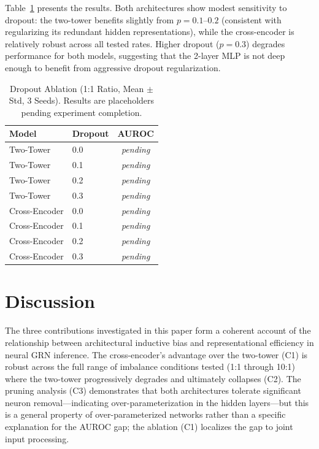 \documentclass[journal]{IEEEtran}
\begin{document}
Table~\ref{tab:dropout} presents the results. Both architectures show
modest sensitivity to dropout: the two-tower benefits slightly from
$p=0.1$--$0.2$ (consistent with regularizing its redundant hidden
representations), while the cross-encoder is relatively robust across
all tested rates. Higher dropout ($p=0.3$) degrades performance for both
models, suggesting that the 2-layer MLP is not deep enough to benefit from
aggressive dropout regularization.

\begin{table}[!t]
  \caption{Dropout Ablation (1:1 Ratio, Mean $\pm$ Std, 3 Seeds).
    Results are placeholders pending experiment completion.}
  \label{tab:dropout}
  \centering
  \footnotesize
  \begin{tabular}{@{}llc@{}}
    \hline
    Model & Dropout & AUROC \\
    \hline
    Two-Tower     & 0.0 & \textit{pending} \\
    Two-Tower     & 0.1 & \textit{pending} \\
    Two-Tower     & 0.2 & \textit{pending} \\
    Two-Tower     & 0.3 & \textit{pending} \\
    \hline
    Cross-Encoder & 0.0 & \textit{pending} \\
    Cross-Encoder & 0.1 & \textit{pending} \\
    Cross-Encoder & 0.2 & \textit{pending} \\
    Cross-Encoder & 0.3 & \textit{pending} \\
    \hline
  \end{tabular}
\end{table}

\section{Discussion}
\label{sec:discussion}

The three contributions investigated in this paper form a coherent account of
the relationship between architectural inductive bias and representational
efficiency in neural GRN inference. The cross-encoder's advantage over the
two-tower (C1) is robust across the full range of imbalance conditions tested
(1:1 through 10:1) where the two-tower progressively degrades and ultimately
collapses (C2). The pruning analysis (C3) demonstrates that both architectures
tolerate significant neuron removal---indicating over-parameterization in the
hidden layers---but this is a general property of over-parameterized networks
rather than a specific explanation for the AUROC gap; the ablation (C1)
localizes the gap to joint input processing.
\end{document}
